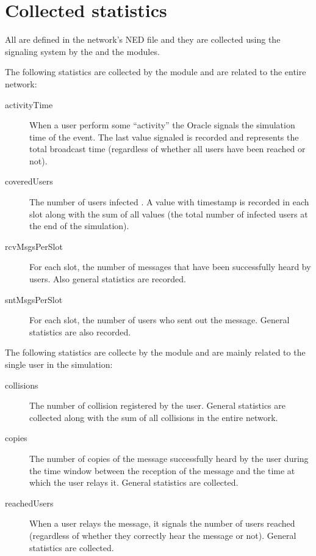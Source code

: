 \section{Collected statistics}\label{sec:statistics}

All  are defined in the  network's NED file and
they are collected using the \omnetpp{} signaling system by the 
and the  modules.

The following statistics are collected by the  module and are
related to the entire  network:
\begin{description}
	\item[activityTime] When a user perform some ``activity''  the Oracle signals
		the simulation time of the event. The last value signaled is
		recorded and represents the total broadcast time (regardless of
		whether all users have been reached or not).
	\item[coveredUsers] The number of users infected . A value with timestamp is
		recorded in each slot along with the sum of all values (the
		total number of infected users at the end of the simulation).
	\item[rcvMsgsPerSlot] For each slot, the number of messages that have
		been successfully heard by users. Also general statistics
		 are recorded.
	\item[sntMsgsPerSlot] For each slot, the number of users who sent out
		the message. General statistics are also recorded.
\end{description}

The following statistics are collecte by the  module and are mainly
related to the single user in the simulation:
\begin{description}
	\item[collisions] The number of collision registered by the user.
		General statistics are collected along with the sum of all
		collisions in the entire network.
	\item[copies] The number of copies of the message successfully heard by
		the user during the time window between the reception of the
		message and the time at which the user relays it. General
		statistics are collected.
	\item[reachedUsers] When a user relays the message, it signals the
		number of users reached (regardless of whether they correctly
		hear the message or not). General statistics are collected.
\end{description}

